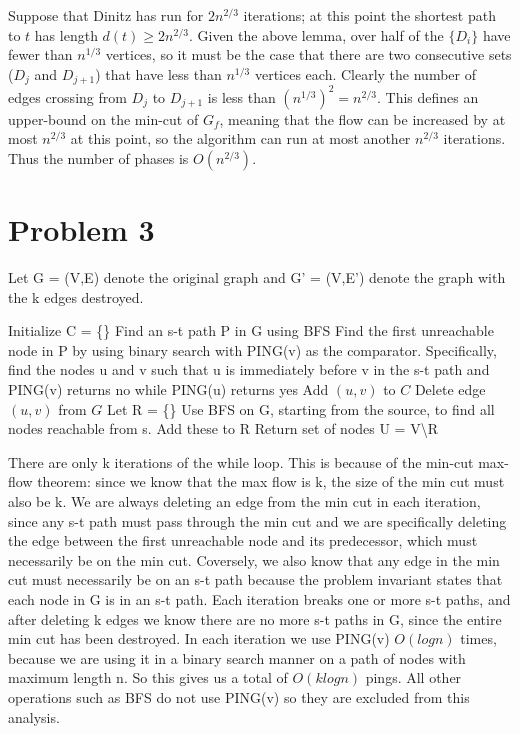 \documentclass{article}
\begin{document}
Suppose that Dinitz has run for $2n^{2/3}$ iterations; at this point the 
shortest path to $t$ has length $d(t)\geq 2n^{2/3}$. 
Given the above lemma, over half of the $\{D_i\}$ have fewer than
$n^{1/3}$ vertices, so it must be the case that there are two consecutive sets
($D_j$ and $D_{j+1}$) that have less than $n^{1/3}$ vertices each.
Clearly the number of edges crossing from $D_j$ to $D_{j+1}$ is less than $(n^{1/3})^2 = n^{2/3}$.
This defines an upper-bound on the min-cut of $G_f$, meaning that the flow
can be increased by at most $n^{2/3}$ at this point, so 
the algorithm can run at most another $n^{2/3}$ iterations. Thus the number
of phases is $O(n^{2/3})$.

\section*{Problem 3}

Let G = (V,E) denote the original graph and G' = (V,E') denote the graph with the k edges destroyed.
\begin{algorithm}[H]
\caption{}
\begin{algorithmic}[1]
\State Initialize C = \{\}
\State Find an s-t path P in G using BFS
\State Find the first unreachable node in P by using binary search with PING(v) as the comparator. Specifically, find the nodes u and v such that u is immediately before v in the s-t path and PING(v) returns no while PING(u) returns yes
\State Add $(u,v)$ to $C$
\State Delete edge $(u,v)$ from $G$
\EndWhile
\State Let R = \{\}
\State Use BFS on G, starting from the source, to find all nodes reachable from s. Add these to R
\State Return set of nodes U = V\textbackslash R
\end{algorithmic}
\end{algorithm}

There are only k iterations of the while loop. This is because of the min-cut
max-flow theorem: since we know that the max flow is k, the size of the min cut
must also be k. We are always deleting an edge from the min cut in each
iteration, since any s-t path must pass through the min cut and we are
specifically deleting the edge between the first unreachable node and its
predecessor, which must necessarily be on the min cut. Coversely, we also know
that any edge in the min cut must necessarily be on an s-t path because the
problem invariant states that each node in G is in an s-t path. Each iteration
breaks one or more s-t paths, and after deleting k edges we know there are no
more s-t paths in G, since the entire min cut has been destroyed. In each
iteration we use PING(v) $O(log n)$ times, because we are using it in a binary
search manner on a path of nodes with maximum length n. So this gives us a
total of $O(k log n)$ pings. All other operations such as BFS do not use PING(v)
so they are excluded from this analysis.
\end{document}
